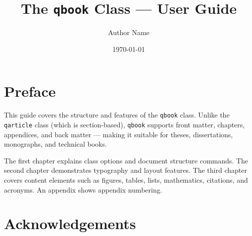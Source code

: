 \documentclass[sans,oneside,numeric,raggedright,fullwidth]{qbook}
\title{The \texttt{qbook} Class --- User Guide}
\author{Author Name}
\date{\today}
\begin{document}
\frontmatter


\dedication{To everyone who enjoys well-typeset books.}

\chapter{Preface}

This guide covers the structure and features of the \texttt{qbook} class.
Unlike the \texttt{qarticle} class (which is section-based), \texttt{qbook}
supports front matter, chapters, appendices, and back matter --- making it
suitable for theses, dissertations, monographs, and technical books.

The first chapter explains class options and document structure commands.
The second chapter demonstrates typography and layout features.  The third
chapter covers content elements such as figures, tables, lists,
mathematics, citations, and acronyms.  An appendix shows appendix
numbering.

\chapter{Acknowledgements}
\end{document}
